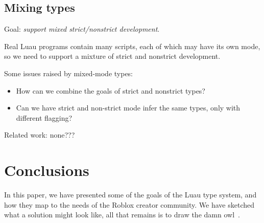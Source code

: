 \documentclass[acmsmall]{acmart}
\begin{document}
\subsection{Mixing types}

Goal: \emph{support mixed strict/nonstrict development}.

Real Luau programs contain many scripts, each of which may have its own mode,
so we need to support a mixture of strict and nonstrict development.

Some issues raised by mixed-mode types:
\begin{itemize}

\item How can we combine the goals of strict and nonstrict types?

\item Can we have strict and non-strict mode infer the same types,
  only with different flagging?

\end{itemize}
Related work: none???

\section{Conclusions}

In this paper, we have presented some of the goals of the Luau type
system, and how they map to the needs of the Roblox creator
community. We have sketched what a solution might look like, all that
remains is to draw the damn owl~\cite{owl}.

 
\end{document}
